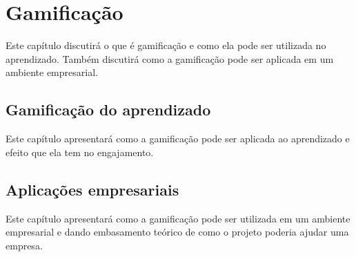 \chapter{Gamificação}
\label{chap:cap1}
 
Este capítulo discutirá o que é gamificação e como ela pode ser utilizada no aprendizado. Também discutirá como a gamificação pode ser aplicada em um ambiente empresarial.


\section{Gamificação do aprendizado}
\label{sec:superv}

Este capítulo apresentará como a gamificação pode ser aplicada ao aprendizado e efeito que ela tem no engajamento.


\section{Aplicações empresariais}
\label{sec:nsuperv}

Este capítulo apresentará como a gamificação pode ser utilizada em um ambiente empresarial e dando embasamento teórico de como o projeto poderia ajudar uma empresa.



